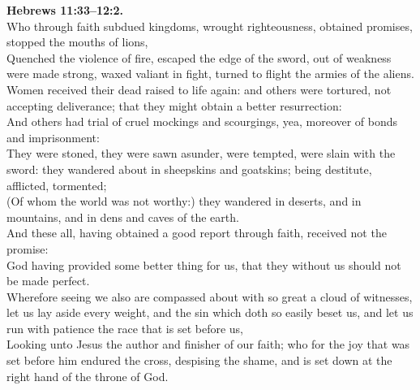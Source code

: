 \documentclass[10pt]{article} %
\begin{document}
{\begin{minipage}[t]{0.48\textwidth}
\textbf{Hebrews 11:33--12:2.}\\
Who through faith subdued kingdoms, wrought righteousness, obtained promises, stopped the mouths of lions,\\
Quenched the violence of fire, escaped the edge of the sword, out of weakness were made strong, waxed valiant in fight, turned to flight the armies of the aliens.\\
Women received their dead raised to life again: and others were tortured, not accepting deliverance; that they might obtain a better resurrection:\\
And others had trial of cruel mockings and scourgings, yea, moreover of bonds and imprisonment:\\
They were stoned, they were sawn asunder, were tempted, were slain with the sword: they wandered about in sheepskins and goatskins; being destitute, afflicted, tormented;\\
(Of whom the world was not worthy:) they wandered in deserts, and in mountains, and in dens and caves of the earth.\\
And these all, having obtained a good report through faith, received not the promise:\\
God having provided some better thing for us, that they without us should not be made perfect.\\
Wherefore seeing we also are compassed about with so great a cloud of witnesses, let us lay aside every weight, and the sin which doth so easily beset us, and let us run with patience the race that is set before us,\\
Looking unto Jesus the author and finisher of our faith; who for the joy that was set before him endured the cross, despising the shame, and is set down at the right hand of the throne of God.\\

\end{minipage}}
\vspace*{\fill}
\newpage
\Huge%
\vspace*{\fill}
\end{document}
